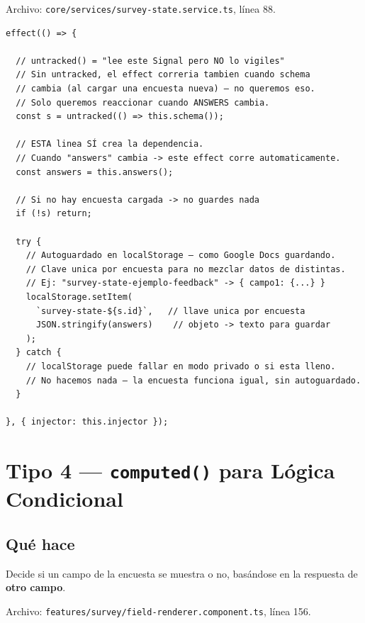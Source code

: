 \documentclass[12pt, a4paper]{article}
\begin{document}
Archivo: \textcolor{morado}{\texttt{core/services/survey-state.service.ts}}, línea 88.

\begin{lstlisting}
effect(() => {

  // untracked() = "lee este Signal pero NO lo vigiles"
  // Sin untracked, el effect correria tambien cuando schema
  // cambia (al cargar una encuesta nueva) — no queremos eso.
  // Solo queremos reaccionar cuando ANSWERS cambia.
  const s = untracked(() => this.schema());

  // ESTA linea SÍ crea la dependencia.
  // Cuando "answers" cambia -> este effect corre automaticamente.
  const answers = this.answers();

  // Si no hay encuesta cargada -> no guardes nada
  if (!s) return;

  try {
    // Autoguardado en localStorage — como Google Docs guardando.
    // Clave unica por encuesta para no mezclar datos de distintas.
    // Ej: "survey-state-ejemplo-feedback" -> { campo1: {...} }
    localStorage.setItem(
      `survey-state-${s.id}`,   // llave unica por encuesta
      JSON.stringify(answers)    // objeto -> texto para guardar
    );
  } catch {
    // localStorage puede fallar en modo privado o si esta lleno.
    // No hacemos nada — la encuesta funciona igual, sin autoguardado.
  }

}, { injector: this.injector });
\end{lstlisting}

\section{ Tipo 4 — \texttt{computed()} para Lógica Condicional}

\subsection{Qué hace}

Decide si un campo de la encuesta se muestra o no,
basándose en la respuesta de \textbf{otro campo}.

Archivo: \textcolor{morado}{\texttt{features/survey/field-renderer.component.ts}}, línea 156.
\end{document}
